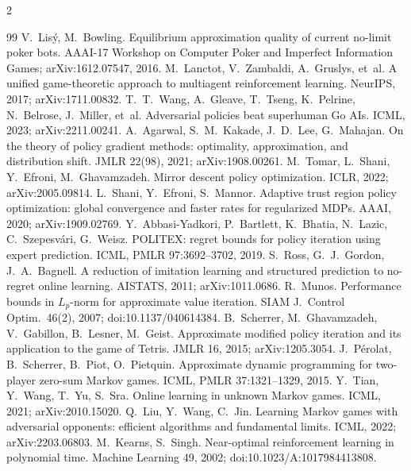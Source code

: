 \documentclass[10pt]{article}
\theoremstyle{plain}
\theoremstyle{definition}
\theoremstyle{remark}
\begin{document}
\begin{multicols}{2}
\begin{thebibliography}{99}
 V.~Lis\'y, M.~Bowling. Equilibrium approximation quality of current no-limit poker bots. AAAI-17 Workshop on Computer Poker and Imperfect Information Games; arXiv:1612.07547, 2016. %
 M.~Lanctot, V.~Zambaldi, A.~Gruslys, et~al. A unified game-theoretic approach to multiagent reinforcement learning. NeurIPS, 2017; arXiv:1711.00832. %
 T.~T.~Wang, A.~Gleave, T.~Tseng, K.~Pelrine, N.~Belrose, J.~Miller, et~al. Adversarial policies beat superhuman Go AIs. ICML, 2023; arXiv:2211.00241. %
 A.~Agarwal, S.~M.~Kakade, J.~D.~Lee, G.~Mahajan. On the theory of policy gradient methods: optimality, approximation, and distribution shift. JMLR 22(98), 2021; arXiv:1908.00261. %
 M.~Tomar, L.~Shani, Y.~Efroni, M.~Ghavamzadeh. Mirror descent policy optimization. ICLR, 2022; arXiv:2005.09814. %
 L.~Shani, Y.~Efroni, S.~Mannor. Adaptive trust region policy optimization: global convergence and faster rates for regularized MDPs. AAAI, 2020; arXiv:1909.02769. %
 Y.~Abbasi-Yadkori, P.~Bartlett, K.~Bhatia, N.~Lazic, C.~Szepesv\'ari, G.~Weisz. POLITEX: regret bounds for policy iteration using expert prediction. ICML, PMLR 97:3692--3702, 2019.
 S.~Ross, G.~J.~Gordon, J.~A.~Bagnell. A reduction of imitation learning and structured prediction to no-regret online learning. AISTATS, 2011; arXiv:1011.0686. %
 R.~Munos. Performance bounds in $L_p$-norm for approximate value iteration. SIAM J.\ Control Optim.\ 46(2), 2007; doi:10.1137/040614384.
 B.~Scherrer, M.~Ghavamzadeh, V.~Gabillon, B.~Lesner, M.~Geist. Approximate modified policy iteration and its application to the game of Tetris. JMLR 16, 2015; arXiv:1205.3054. %
 J.~P\'erolat, B.~Scherrer, B.~Piot, O.~Pietquin. Approximate dynamic programming for two-player zero-sum Markov games. ICML, PMLR 37:1321--1329, 2015.
 Y.~Tian, Y.~Wang, T.~Yu, S.~Sra. Online learning in unknown Markov games. ICML, 2021; arXiv:2010.15020. %
 Q.~Liu, Y.~Wang, C.~Jin. Learning Markov games with adversarial opponents: efficient algorithms and fundamental limits. ICML, 2022; arXiv:2203.06803. %
 M.~Kearns, S.~Singh. Near-optimal reinforcement learning in polynomial time. Machine Learning 49, 2002; doi:10.1023/A:1017984413808.
\end{thebibliography}
\end{multicols}
\end{document}
